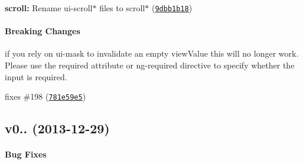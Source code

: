 \begin{DoxyItemize}
\item {\bfseries scroll\+:} Rename ui-\/scroll$\ast$ files to scroll$\ast$ (\href{http://github.com/angular-ui/ui-utils/commit/9dbb1b185ac51bdce834405f7b43e514ad29d978}{\tt 9dbb1b18})
\end{DoxyItemize}

\paragraph*{Breaking Changes}


\begin{DoxyItemize}
\item if you rely on ui-\/mask to invalidate an empty view\+Value this will no longer work. Please use the required attribute or ng-\/required directive to specify whether the input is required.
\end{DoxyItemize}

fixes \#198 (\href{http://github.com/angular-ui/ui-utils/commit/781e59e5a1fa72db91eca6a257408ffe72da0c57}{\tt 781e59e5})

\label{_v0.1.0}%
 \subsection*{v0.. (2013-\/12-\/29)}

\paragraph*{Bug Fixes}


